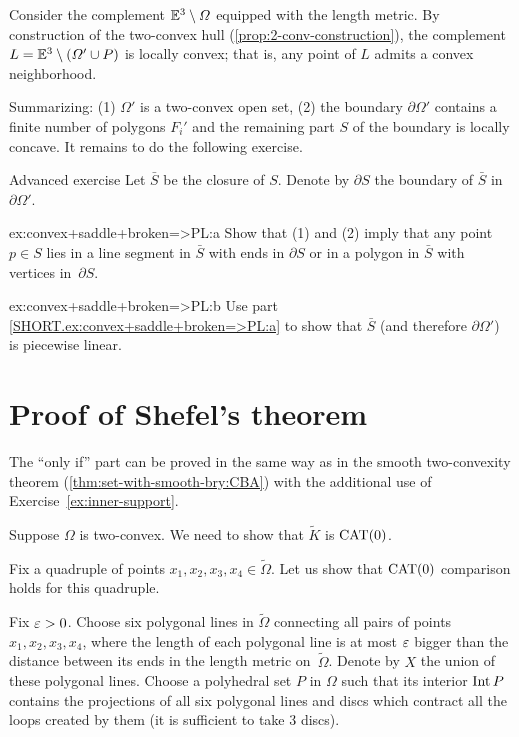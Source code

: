 Consider the complement 
$\mathbb{E}^3\setminus \varOmega$ 
equipped with the length metric.
By construction of the two-convex hull (\ref{prop:2-conv-construction}), 
the complement $L\z=\EE^3\setminus (\Omega'\cup P)$
is locally convex;
that is, any point of $L$ admits a convex neighborhood.

Summarizing: (1)
$\Omega'$ is a two-convex open set,
(2) the boundary $\partial\Omega'$ 
contains a finite number of polygons $F_i'$
and the remaining part $S$ of the boundary is locally concave.
It remains to do the following exercise.

\begin{thm}[!]{Advanced exercise}\label{ex:convex+saddle+broken=>PL}
Let $\bar S$ be the closure of $S$.
Denote by $\partial S$ the boundary of $\bar S$ in $\partial \Omega'$.

\begin{subthm}{ex:convex+saddle+broken=>PL:a}
Show that (1) and (2) imply that any point $p\in S$ lies in a line segment in $\bar S$ with ends in $\partial S$ or in a polygon in $\bar S$ with vertices in~$\partial S$.
\end{subthm}

\begin{subthm}{ex:convex+saddle+broken=>PL:b}
Use part \ref{SHORT.ex:convex+saddle+broken=>PL:a} to show that $\bar S$ (and therefore $\partial\Omega'$)
is piecewise linear. \qeds
\end{subthm}

\end{thm}

\section{Proof of Shefel's theorem}

The ``only if'' part can be proved in the same way as in the smooth two-convexity theorem (\ref{thm:set-with-smooth-bry:CBA}) with the additional use of Exercise~\ref{ex:inner-support}.

Suppose $\Omega$ is two-convex. 
We need to show that $\tilde K$ is $\mathrm{CAT}(0)$.

Fix a quadruple of points $x_1,x_2,x_3,x_4\in\tilde \Omega$.
Let us show that
$\mathrm{CAT}(0)$ comparison holds for this quadruple.

Fix $\varepsilon>0$.
Choose six polygonal lines in $\tilde \Omega$ connecting all pairs of points $x_1,x_2,x_3,x_4$, where the length of each polygonal line is at most $\varepsilon$ bigger than
the distance between its ends in the length metric on~$\tilde \Omega$.
Denote by $X$ the union of these polygonal lines.
Choose a polyhedral set $P$ in $\Omega$ such that its interior $\operatorname{\rm Int}\nolimits P$ contains the projections of all six polygonal lines and discs which contract all the loops created by them (it is sufficient to take 3 discs).

